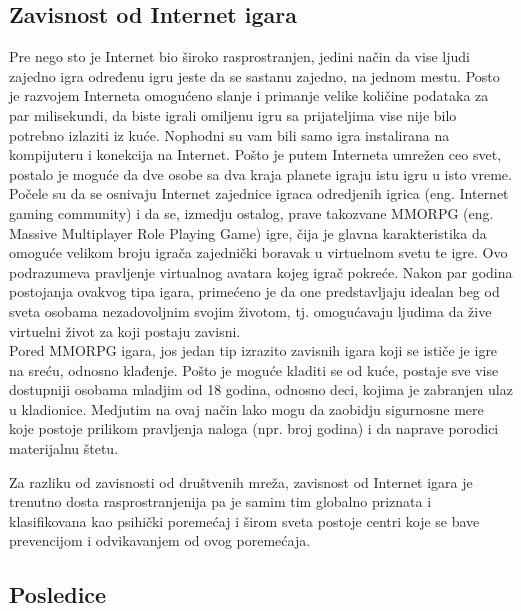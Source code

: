 \documentclass[a4paper]{article}
\begin{document}
\subsection{Zavisnost od Internet igara}	
\label{subsec:podnaslovIP6}

\indent Pre nego sto je Internet bio široko rasprostranjen, jedini način da vise ljudi zajedno igra određenu igru jeste da se sastanu zajedno, na jednom mestu. Posto je razvojem Interneta omogućeno slanje i primanje velike količine podataka za par milisekundi, da biste igrali omiljenu igru sa prijateljima vise nije bilo potrebno izlaziti iz kuće. Nophodni su vam bili samo igra instalirana na kompijuteru i konekcija na Internet. Pošto je putem Interneta umrežen ceo svet, postalo je moguće da dve osobe sa dva kraja planete igraju istu igru u isto vreme. Počele su da se osnivaju Internet zajednice igraca odredjenih igrica (eng. Internet gaming community) i da se, izmedju ostalog, prave takozvane MMORPG (eng. Massive Multiplayer Role Playing Game) igre, čija je glavna karakteristika da omoguće velikom broju igrača zajednički boravak u virtuelnom svetu te igre. Ovo podrazumeva pravljenje virtualnog avatara kojeg igrač pokreće. Nakon par godina postojanja ovakvog tipa igara, primećeno je da one predstavljaju idealan beg od sveta osobama nezadovoljnim svojim životom, tj. omogućavaju ljudima da žive virtuelni život za koji postaju zavisni. 
\\
\indent Pored MMORPG igara, jos jedan tip izrazito zavisnih igara koji se ističe je igre na sreću, odnosno klađenje. Pošto je moguće kladiti se od kuće, postaje sve vise dostupniji osobama mladjim od 18 godina, odnosno deci, kojima je zabranjen ulaz u kladionice. Medjutim na ovaj način lako mogu da zaobidju sigurnosne mere koje postoje prilikom pravljenja naloga (npr. broj godina) i da naprave porodici materijalnu štetu.

Za razliku od zavisnosti od društvenih mreža, zavisnost od Internet igara je trenutno dosta rasprostranjenija pa je samim tim globalno priznata i klasifikovana kao psihički poremećaj i širom sveta postoje centri koje se bave prevencijom i odvikavanjem od ovog poremećaja.

\subsection{Posledice}
\label{subsec:podnaslovZI2}
\end{document}
